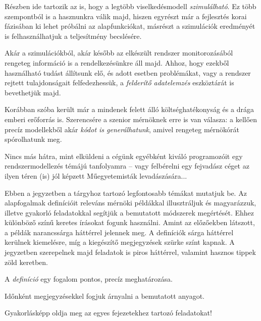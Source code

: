 \begin{pelda}
	Részben ide tartozik az is, hogy a legtöbb viselkedésmodell \emph{szimulálható}. Ez több szempontból is a hasznunkra válik majd, hiszen egyrészt már a fejlesztés korai fázisában ki lehet próbálni az alapfunkciókat, másrészt a szimulációk eredményét is felhasználhatjuk a teljesítmény becslésére.
	
	Akár a szimulációkból, akár később az elkészült rendszer monitorozásából rengeteg információ is a rendelkezésünkre áll majd. Ahhoz, hogy ezekből használható tudást állítsunk elő, és adott esetben problémákat, vagy a rendszer rejtett tulajdonságait felfedezhessük, a \emph{felderítő adatelemzés} eszköztárát is bevethetjük majd.
	
	Korábban szóba került már a mindenek felett álló költséghatékonyság és a drága emberi erőforrás is. Szerencsére a szenior mérnöknek erre is van válasza: a kellően precíz modellekből akár \emph{kódot is generálhatunk}, amivel rengeteg mérnökórát spórolhatunk meg.
	
	Nincs más hátra, mint elküldeni a cégünk egyébként kiváló programozóit egy rendszermodellezés témájú tanfolyamra -- vagy felbérelni egy fejvadász céget az ilyen téren (is) jól képzett Műegyetemisták levadászására...
\end{pelda}

Ebben a jegyzetben a tárgyhoz tartozó legfontosabb témákat mutatjuk be. Az alapfogalmak definícióit releváns mérnöki példákkal illusztráljuk és magyarázzuk, illetve gyakorló feladatokkal segítjük a bemutatott módszerek megértését.
Ehhez különböző színű keretes írásokat fogunk használni. Amint az előzőekben látszott, a példák narancssárga háttérrel jelennek meg. A definíciók sárga háttérrel kerülnek kiemelésre, míg a kiegészítő megjegyzések szürke színt kapnak. A jegyzetben szerepelnek majd feladatok is piros háttérrel, valamint hasznos tippek zöld keretben.

\begin{definicio}
	A \emph{definíció} egy fogalom pontos, precíz meghatározása.
\end{definicio}

\begin{megjegyzes}
	Időnként megjegyzésekkel fogjuk árnyalni a bemutatott anyagot.
\end{megjegyzes}

\begin{feladat}
	Gyakorlásképp oldja meg az egyes fejezetekhez tartozó feladatokat!
\end{feladat}

